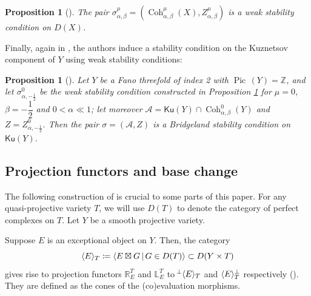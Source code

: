 \documentclass[11pt]{amsart}
\newtheorem{proposition}[thm]{Proposition}
\theoremstyle{definition}
\newcommand{\Z}{\mathbb{Z}}
\newcommand{\HHom}{\mathcal{H}om}
\DeclareMathOperator{\Pic}{Pic\,}
\DeclareMathOperator{\Coh}{Coh}
\newcommand{\sA}{\mathcal{A}}
\newcommand{\st}{\,|\,}					%
\newcommand{\AAA}[1]{\textcolor{red}{#1}}
\DeclarePairedDelimiter{\pair}{\langle}{\rangle}
\newcommand{\Ku}{\mathsf{Ku}}
\begin{document}
\begin{proposition}[{\cite[Proposition~2.15]{BLMS17}}]\label{tiltoftilt}
The pair $\sigma^{\mu}_{\alpha,\beta}= (\Coh^{\mu}_{\alpha, \beta}(X), Z^\mu_{\alpha,\beta})$ is a weak stability condition on $D(X)$.
\end{proposition}

Finally, again in \cite{BLMS17}, the authors induce a stability condition on the Kuznetsov component of $Y$ using weak stability conditions:
\begin{proposition}[{\cite[Theorem~1.1]{BLMS17}}]
\label{thm_stab_con_on_Ku}
Let $Y$ be a Fano threefold of index 2 with $\Pic(Y)=\Z$, and let $\sigma^0_{\alpha,-\frac{1}{2}}$ be the weak stability condition constructed in Proposition \ref{tiltoftilt} for $\mu=0$, $\beta=-\dfrac{1}{2}$ and $0<\alpha \ll 1$; let moreover $\sA= \Ku(Y) \cap \Coh^{0}_{\alpha, \beta}(Y)$ and $Z = Z^0_{\alpha,-\frac{1}{2}}$. Then the pair $\sigma=(\sA, Z)$ is a Bridgeland stability condition on $\Ku(Y)$.
\end{proposition}




\subsection{Projection functors and base change}
\label{sec_basechange_mutations}

The following construction of \cite{Kuz11_base_change} is crucial to some parts of this paper. For any quasi-projective variety $T$, we will use $D(T)$ to denote the category of perfect complexes on $T$. Let $Y$ be a smooth projective variety. 

Suppose $E$ is an exceptional object on $Y$. Then, the category \[\pair{E}_T\coloneqq \pair{E\boxtimes G \st G\in D(T)}\subset D(Y\times T)\] gives rise to projection functors $\mathbb R_E^T$ and $\mathbb L_E^T$ to $\!^\perp\pair{E}_T$ and $\pair{E}_T^\perp$ respectively (\cite[Section~2.3]{Kuz11_base_change}). They are defined as the cones of the (co)evaluation morphisms.
\end{document}
